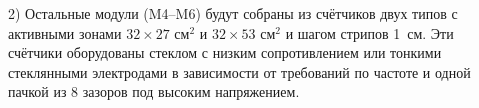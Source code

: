 
2) Остальные модули (M4--M6) будут собраны из счётчиков двух типов с активными зонами $32 \times 27$ см$^2$ и $32 \times 53$ см$^2$ и шагом стрипов 1~см. Эти счётчики оборудованы стеклом с низким сопротивлением или тонкими стеклянными электродами в зависимости от требований по частоте и одной пачкой из 8 зазоров под высоким напряжением.



